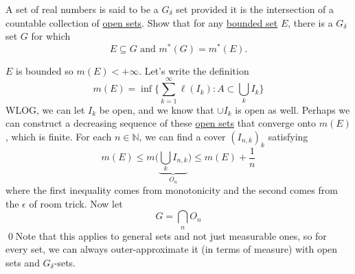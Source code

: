   \begin{exercise}[Royden 2.7][ex:royden2.7]
    A set of real numbers is said to be a $G_{\delta}$ set provided it is the intersection of a countable collection of \hyperref[pst-def:open-set]{open sets}. Show that for any \hyperref[pst-def:bounded-set]{bounded set} $E$, there is a $G_{\delta}$ set $G$ for which
    \begin{equation*}
      E \subseteq G \text{ and } m^{\ast}(G) = m^{\ast}(E).
    \end{equation*}
  \end{exercise}
  \begin{solution}
    $E$ is bounded so $m(E) < +\infty$. Let's write the definition 
    \begin{equation}
      m(E) = \inf \bigg\{ \sum_{k=1}^\infty \ell(I_k) \colon A \subset \bigcup_k I_k \bigg\}
    \end{equation}
    WLOG, we can let $I_k$ be open, and we know that $\cup I_k$ is open as well. Perhaps we can construct a decreasing sequence of these \hyperref[pst-def:open-set]{open sets} that converge onto $m(E)$, which is finite. For each $n \in \mathbb{N}$, we can find a cover $(I_{n, k})_k$ satisfying 
    \begin{equation}
      m(E) \leq m \bigg( \underbrace{\bigcup_{k} I_{n, k}}_{O_n} \bigg) \leq m(E) + \frac{1}{n}
    \end{equation}
    where the first inequality comes from monotonicity and the second comes from the $\epsilon$ of room trick. Now let 
    \begin{equation}
      G = \bigcap_n O_n
    \end{equation}
    \qed Note that this applies to general sets and not just measurable ones, so for every set, we can always outer-approximate it (in terms of measure) with open sets and $G_\delta$-sets. 
  \end{solution}

